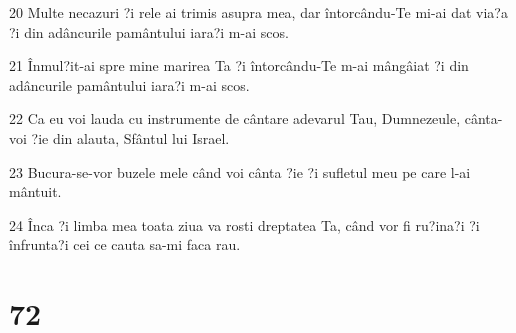 \par 20 Multe necazuri ?i rele ai trimis asupra mea, dar întorcându-Te mi-ai dat via?a ?i din adâncurile pamântului iara?i m-ai scos.
\par 21 Înmul?it-ai spre mine marirea Ta ?i întorcându-Te m-ai mângâiat ?i din adâncurile pamântului iara?i m-ai scos.
\par 22 Ca eu voi lauda cu instrumente de cântare adevarul Tau, Dumnezeule, cânta-voi ?ie din alauta, Sfântul lui Israel.
\par 23 Bucura-se-vor buzele mele când voi cânta ?ie ?i sufletul meu pe care l-ai mântuit.
\par 24 Înca ?i limba mea toata ziua va rosti dreptatea Ta, când vor fi ru?ina?i ?i înfrunta?i cei ce cauta sa-mi faca rau.

\chapter{72}

